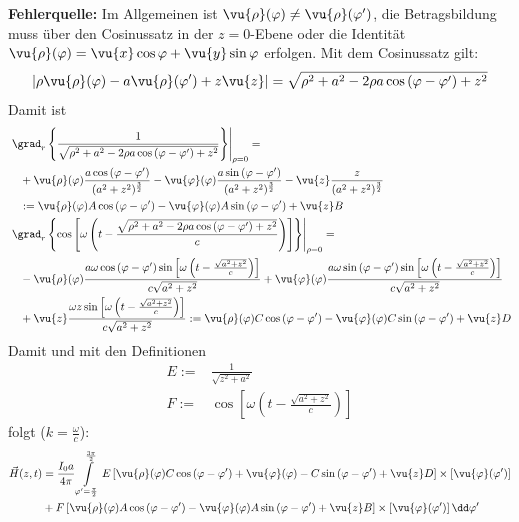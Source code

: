 \textbf{Fehlerquelle:} Im Allgemeinen ist $\vu{\rho}(\varphi)\neq\vu{\rho}(\varphi')$, die Betragsbildung muss über den Cosinussatz in der $z=0$-Ebene oder die Identität $\vu{\rho}(\varphi)=\vu{x}\cos\varphi+\vu{y}\sin\varphi$ erfolgen. Mit dem Cosinussatz gilt:
\begin{equation*}
	\left|\rho\vu{\rho}(\varphi)-a\vu{\rho}(\varphi')+z\vu{z}\right|=\sqrt{\rho^2+a^2-2\rho a\cos{\left(\varphi-\varphi'\right)}+z^2}
\end{equation*}
Damit ist
\begin{equation*}\begin{split}
	&\left.\grad_r\left\{\frac{1}{\sqrt{\rho^2+a^2-2\rho a\cos{\left(\varphi-\varphi'\right)}+z^2}}\right\}\right|_{\rho=0}=\\
	&\quad+\vu{\rho}(\varphi)\frac{a\cos{\left(\varphi-\varphi'\right)}}{(a^2+z^2)^{\frac{3}{2}}} -\vu{\varphi}(\varphi)\frac{a \sin{\left(\varphi-\varphi'\right)}}{(a^2+z^2)^{\frac{3}{2}}} -\vu{z}\frac{z}{(a^2+z^2)^{\frac{3}{2}}}\\
	&\quad:=\vu{\rho}(\varphi)A\cos{\left(\varphi-\varphi'\right)}-\vu{\varphi}(\varphi)A\sin{\left(\varphi-\varphi'\right)}+\vu{z}B\\
	&\left.\grad_r\left\{\cos\left[\omega \left({t}-\frac{\sqrt{\rho^2+a^2-2\rho a\cos{\left(\varphi-\varphi'\right)}+z^2}}{{c}}\right)\right]\right\}\right|_{\rho=0}=\\
	&\quad-\vu{\rho}(\varphi)\frac{a\omega\cos{\left(\varphi-\varphi'\right)}\sin\left[\omega \left({t}-\frac{\sqrt{a^2+z^2}}{{c}}\right)\right]}{c\sqrt{a^2+z^2}}+\vu{\varphi}(\varphi)\frac{a\omega\sin{\left(\varphi-\varphi'\right)}\sin\left[\omega \left({t}-\frac{\sqrt{a^2+z^2}}{{c}}\right)\right]}{c\sqrt{a^2+z^2}}\\
	&\quad+\vu{z}\frac{\omega z\sin\left[\omega \left({t}-\frac{\sqrt{a^2+z^2}}{{c}}\right)\right]}{c\sqrt{a^2+z^2}}:=\vu{\rho}(\varphi)C\cos{\left(\varphi-\varphi'\right)}-\vu{\varphi}(\varphi)C\sin{\left(\varphi-\varphi'\right)}+\vu{z}D
\end{split}\end{equation*}
Damit und mit den Definitionen
\begin{equation*}\begin{split}
 E:=&\frac{1}{\sqrt{z^2+a^2}}\\
 F:=&\cos\left[\omega \left({t}-\frac{\sqrt{a^2+z^2}}{{c}}\right)\right]
\end{split}\end{equation*}
folgt ($k=\frac{\omega}{c}$):
\begin{equation*}\begin{split}
		\vec{{H}}(z, {t})&=\frac{I_{0} a}{4 \pi}\int\limits_{\varphi'=\frac{\pi}{2}}^{\frac{3\pi}{2}} E\left[\vu{\rho}(\varphi)C\cos{\left(\varphi-\varphi'\right)}+\vu{\varphi}(\varphi)-C\sin{\left(\varphi-\varphi'\right)}+\vu{z}D\right]\times\left[\vu{\varphi}(\varphi')\right]\\\quad&+F\left[\vu{\rho}(\varphi)A\cos{\left(\varphi-\varphi'\right)}-\vu{\varphi}(\varphi)A\sin{\left(\varphi-\varphi'\right)}+\vu{z}B\right]\times\left[\vu{\varphi}(\varphi')\right] \dd \varphi'
	\end{split}\end{equation*}

